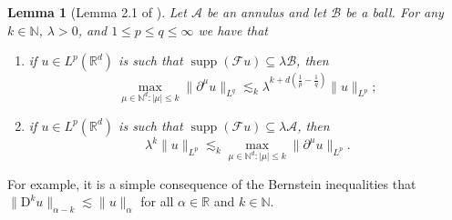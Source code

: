 \documentclass[11pt,a4paper]{article}
\newcommand{\mathD}{\mathrm{D}}
\newcommand{\tmop}[1]{\ensuremath{\operatorname{#1}}}
\newenvironment{enumeratenumeric}{\begin{enumerate}[1.] }{\end{enumerate}}
\newtheorem{lemma}[theorem]{Lemma}
\theoremstyle{remark}
\newcommand{\R}{\mathbb{R}}
\newcommand{\N}{\mathbb{N}}
\newcommand{\CA}{\ensuremath{\mathscr{A}}}
\newcommand{\CB}{\ensuremath{\mathscr{B}}}
\newcommand{\CF}{\ensuremath{\mathscr{F}}}
\begin{document}
\begin{lemma}[Lemma 2.1 of {\cite{Bahouri2011}}]\label{lemma:Bernstein}
   Let $\CA$ be an annulus and let $\CB$ be a ball. For any $k \in \mathbb{N}$, $\lambda >0$, and $1 \leqslant p \leqslant q \leqslant \infty$ we have that
   \begin{enumeratenumeric}
      \item if $u \in L^{p} ( \mathbb{R}^{d} )$ is such that $\tmop{supp} ( \CF u ) \subseteq \lambda \CB$, then
         \[
            \max_{\mu \in \mathbb{N}^{d} : | \mu | \leqslant k} \| \partial^{\mu} u \|_{L^{q}} \lesssim_{k} \lambda^{k+d \left( \frac{1}{p} - \frac{1}{q} \right)} \| u \|_{L^{p}};
         \]
      \item if $u \in L^{p} ( \mathbb{R}^{d} )$ is such that $\tmop{supp} (\CF u ) \subseteq \lambda \CA$, then
         \[
            \lambda^{k} \| u \|_{L^{p}} \lesssim_{k} \max_{\mu \in \mathbb{N}^{d}: | \mu | \leqslant k} \| \partial^{\mu} u \|_{L^{p}} .
         \]
  \end{enumeratenumeric}
\end{lemma}

For example, it is a simple consequence of the Bernstein inequalities that $\| \mathD^k u \|_{\alpha-k} \lesssim \| u \|_\alpha$ for all $\alpha \in \R$ and $k \in \N$.
\end{document}

